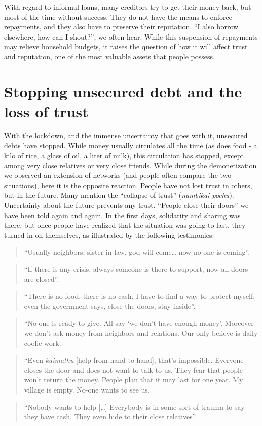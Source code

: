 \documentclass[a4paper, 11pt, onecolumn]{article}
\begin{document}
With regard to informal loans, many creditors try to get their money back, but most of the time without success. They do not have the means to enforce repayments, and they also have to preserve their reputation. ``I also borrow elsewhere, how can I shout?'', we often hear. While this suspension of repayments may relieve household budgets, it raises the question of how it will affect trust and reputation, one of the most valuable assets that people possess.

\section{Stopping unsecured debt and the loss of trust}
\label{section:trust}

With the lockdown, and the immense uncertainty that goes with it, unsecured debts have stopped.  While money usually circulates all the time (as does food - a kilo of rice, a glass of oil, a liter of milk), this circulation has stopped, except among very close relatives or very close friends. While during the demonetization we observed an extension of networks (and people often compare the two situations), here it is the opposite reaction. People have not lost trust in others, but in the future. Many mention the “collapse of trust” (\textit{nambikai pochu}). Uncertainty about the future prevents any trust. “People close their doors” we have been told again and again. In the first days, solidarity and sharing was there, but once people have realized that the situation was going to last, they turned in on themselves, as illustrated by the following testimonies:
\begin{quote} 
“Usually neighbors, sister in law, god will come… now no one is coming”.
\end{quote}
\begin{quote}
“If there is any crisis, always someone is there to support, now all doors are closed”. 
\end{quote}
\begin{quote}
“There is no food, there is no cash, I have to find a way to protect myself; even the government says, close the doors, stay inside”. 
\end{quote}
\begin{quote}
“No one is ready to give. All say ‘we don’t have enough money’. Moreover we don’t ask money from neighbors and relations. Our only believe is daily coolie work. 
\end{quote}
\begin{quote}
“Even \textit{kaimathu} [help from hand to hand], that's impossible. Everyone closes the door and does not want to talk to us. They fear that people won't return the money. People plan that it may last for one year. My village is empty. No-one wants to see us.
\end{quote}
\begin{quote}
 “Nobody wants to help […] Everybody is in some sort of trauma to say they have cash. They even hide to their close relatives”. 
\end{quote}
\end{document}
